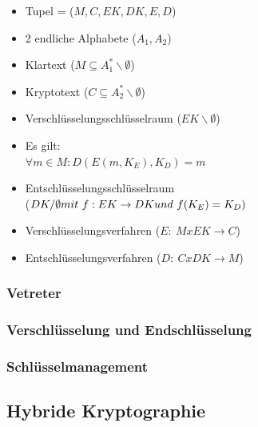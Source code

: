 \documentclass[paper=a4,11pt,german]{scrartcl} %
\begin{document}
\begin{minipage}[t]{0.45\linewidth}
\centering
\begin{itemize}
\item Tupel = ($M,C,EK,DK,E,D$)
\item 2 endliche Alphabete ($A_1,A_2$)
\item Klartext ($M \subseteq A^*_1\backslash\emptyset$)
\item Kryptotext ($C \subseteq A^*_2\backslash\emptyset$)
\item Verschlüsselungsschlüsselraum ($EK\backslash\emptyset$)
\item Es gilt:
\\ $\forall m\in M : D(E(m,K_E),K_D) = m$
\end{itemize}
\end{minipage}
\begin{minipage}[t]{0.45\linewidth}
\begin{itemize}
\item Entschlüsselungsschlüsselraum\\
($DK/\emptyset \\mit~ f:EK \rightarrow DK \\und~ f(K_E)=K_D)$
\item Verschlüsselungsverfahren ($E :~ M x EK \rightarrow C$)
\item Entschlüsselungsverfahren ($D :~ C x DK \rightarrow M$)
\end{itemize}
\end{minipage}

\subsubsection{Vetreter}
\subsubsection{Verschlüsselung und Endschlüsselung}
\subsubsection{Schlüsselmanagement}
\subsection{Hybride Kryptographie}
\end{document}
